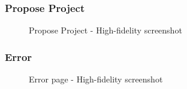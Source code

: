 \documentclass[11pt, letterpaper]{article}
\begin{document}
\subsubsection*{Propose Project}
\begin{figure}[H]
    \centering
    \setlength{\fboxsep}{0pt}
    \caption{Propose Project - High-fidelity screenshot}
    \label{fig:PageScreenshot_Propose_Project}
\end{figure}

\subsubsection*{Error}
\begin{figure}[H]
    \centering
    \setlength{\fboxsep}{0pt}
    \caption{Error page - High-fidelity screenshot}
    \label{fig:PageScreenshot_Propose_Project}
\end{figure}
\end{document}

